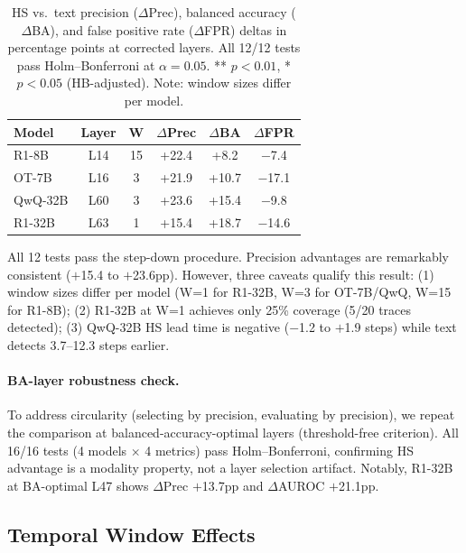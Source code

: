 \documentclass[11pt]{article}
\begin{document}
\begin{table}[t]
\centering
\small
\begin{tabular}{lccccc}
\toprule
\textbf{Model} & \textbf{Layer} & \textbf{W} & \textbf{$\Delta$Prec} & \textbf{$\Delta$BA} & \textbf{$\Delta$FPR} \\
\midrule
R1-8B & L14 & 15 & +22.4\rlap{**} & +8.2\rlap{**} & $-$7.4\rlap{*} \\
OT-7B & L16 & 3 & +21.9\rlap{**} & +10.7\rlap{**} & $-$17.1\rlap{**} \\
QwQ-32B & L60 & 3 & +23.6\rlap{**} & +15.4\rlap{**} & $-$9.8\rlap{**} \\
R1-32B & L63 & 1 & +15.4\rlap{**} & +18.7\rlap{**} & $-$14.6\rlap{**} \\
\bottomrule
\end{tabular}
\caption{HS vs.\ text precision ($\Delta$Prec), balanced accuracy ($\Delta$BA), and false positive rate ($\Delta$FPR) deltas in percentage points at corrected layers. All 12/12 tests pass Holm--Bonferroni at $\alpha{=}0.05$. ** $p{<}0.01$, * $p{<}0.05$ (HB-adjusted). Note: window sizes differ per model.}
\label{tab:hb_summary}
\end{table}

All 12 tests pass the step-down procedure. Precision advantages are remarkably consistent ($+$15.4 to $+$23.6pp). However, three caveats qualify this result: (1) window sizes differ per model (W=1 for R1-32B, W=3 for OT-7B/QwQ, W=15 for R1-8B); (2) R1-32B at W=1 achieves only 25\% coverage (5/20 traces detected); (3) QwQ-32B HS lead time is negative ($-$1.2 to $+$1.9 steps) while text detects 3.7--12.3 steps earlier.

\paragraph{BA-layer robustness check.}
To address circularity (selecting by precision, evaluating by precision), we repeat the comparison at balanced-accuracy-optimal layers (threshold-free criterion). All 16/16 tests (4 models $\times$ 4 metrics) pass Holm--Bonferroni, confirming HS advantage is a modality property, not a layer selection artifact. Notably, R1-32B at BA-optimal L47 shows $\Delta$Prec $+$13.7pp and $\Delta$AUROC $+$21.1pp.

\subsection{Temporal Window Effects}
\label{sec:temporal}
\end{document}
